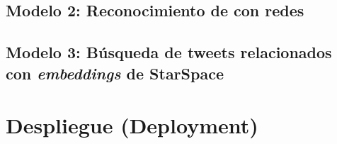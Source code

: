 
\subsection{Modelo 2: Reconocimiento de  con redes }

\subsection{Modelo 3: Búsqueda de tweets relacionados con \emph{embeddings} de \mbox{StarSpace}}


\section{Despliegue (Deployment)}
